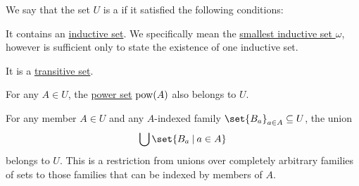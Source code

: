 \begin{definition}\label{def:grothendieck_universe}
  We say that the set \( U \) is a  if it satisfied the following conditions:
  \begin{thmenum}
     It contains an \hyperref[def:inductive_set]{inductive set}. We specifically mean the \hyperref[thm:smallest_inductive_set_existence]{smallest inductive set \( \omega \)}, however is sufficient only to state the existence of one inductive set.

     It is a \hyperref[def:transitive_set]{transitive set}.

     For any \( A \in U \), the \hyperref[def:basic_set_operations/power_set]{power set} \( \operatorname{pow}(A) \) also belongs to \( U \).

     For any member \( A \in U \) and any \( A \)-indexed family \( \set{ B_a }_{a \in A} \subseteq U \), the union
    \begin{equation*}
      \bigcup\set{ B_a \given a \in A }
    \end{equation*}
    belongs to \( U \). This is a restriction from unions over completely arbitrary families of sets to those families that can be indexed by members of \( A \).
  \end{thmenum}


\end{definition}
